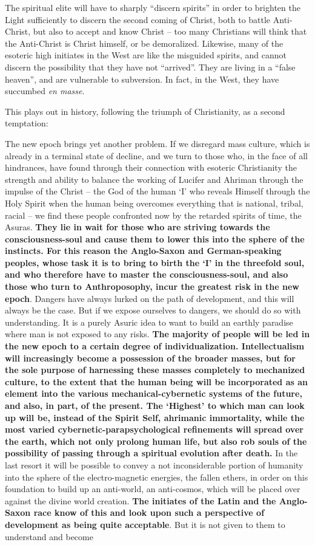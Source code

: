 The spiritual elite will have to sharply ``discern spirits'' in order to brighten the Light sufficiently to discern the second coming of Christ, both to battle Anti-Christ, but also to accept and know Christ -- too many Christians will think that the Anti-Christ is Christ himself, or be demoralized. Likewise, many of the esoteric high initiates in the West are like the misguided spirits, and cannot discern the possibility that they have not ``arrived''. They are living in a ``false heaven'', and are vulnerable to subversion. In fact, in the West, they have succumbed \emph{en masse}.


This plays out in history, following the triumph of Christianity, as a second temptation:

\begin{quotex}
The new epoch brings yet another problem. If we disregard mass culture, which is already in a terminal state of decline, and we turn to those who, in the face of all hindrances, have found through their connection with esoteric Christianity the strength and ability to balance the working of Lucifer and Ahriman through the impulse of the Christ -- the God of the human `I' who reveals Himself through the Holy Spirit when the human being overcomes everything that is national, tribal, racial -- we find these people confronted now by the retarded spirits of time, the Asuras. \textbf{They lie in wait for those who are striving towards the consciousness-soul and cause them to lower this into the sphere of the instincts. For this reason the Anglo-Saxon and German-speaking peoples, whose task it is to bring to birth the `I' in the threefold soul, and who therefore have to master the consciousness-soul, and also those who turn to Anthroposophy, incur the greatest risk in the new epoch}. Dangers have always lurked on the path of development, and this will always be the case. But if we expose ourselves to dangers, we should do so with understanding. It is a purely Asuric idea to want to build an earthly paradise where man is not exposed to any risks. \textbf{The majority of people will be led in the new epoch to a certain degree of individualization. Intellectualism will increasingly become a possession of the broader masses, but for the sole purpose of harnessing these masses completely to mechanized culture, to the extent that the human being will be incorporated as an element into the various mechanical-cybernetic systems of the future, and also, in part, of the present. The `Highest' to which man can look up will be, instead of the Spirit Self, ahrimanic immortality, while the most varied cybernetic-parapsychological refinements will spread over the earth, which not only prolong human life, but also rob souls of the possibility of passing through a spiritual evolution after death.} In the last resort it will be possible to convey a not inconsiderable portion of humanity into the sphere of the electro-magnetic energies, the fallen ethers, in order on this foundation to build up an anti-world, an anti-cosmos, which will be placed over against the divine world creation. \textbf{The initiates of the Latin and the Anglo-Saxon race know of this and look upon such a perspective of development as being quite acceptable}. But it is not given to them to understand and become 
\end{quotex}
